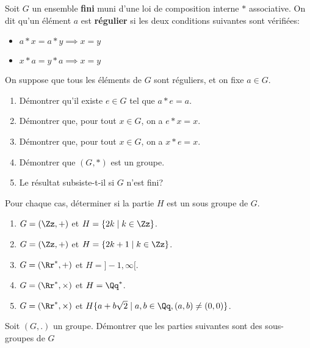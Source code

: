 \documentclass[10pt, a4paper, twocolumn]{homework}
\begin{document}
Soit $G$ un ensemble \textbf{fini} muni d'une loi de composition interne $*$
associative. On dit qu'un élément $a$ est \textbf{régulier} si les deux
conditions suivantes sont vérifiées:
\begin{itemize}
  \item $a * x = a * y \implies x = y$
  \item $x *a  = y * a \implies x = y$
\end{itemize}
On suppose que tous les éléments de $G$ sont réguliers, et on fixe $a\in G$.

\begin{enumerate}
  \item Démontrer qu'il existe $e\in G$ tel que $a*e = a$.\\[2pt]
  \item Démontrer que, pour tout $x\in G$, on a $e*x = x$.\\[2pt]
  \item Démontrer que, pour tout $x\in G$, on a $x*e = x$.\\[2pt]
  \item Démontrer que $\left(G, *\right)$ est un groupe.
  \item Le résultat subsiste-t-il si $G$ n'est fini?
\end{enumerate}



Pour chaque cas,  déterminer si la partie $H$ est un sous groupe de $G$.

\begin{enumerate}
  \item $G = \left(\Zz,+\right)$ et $H =\{2k\;|\; k\in \Zz\}$.
  \item $G = \left(\Zz,+\right)$ et $H =\{2k+1\;|\; k\in \Zz\}$.
  \item $G = \left(\Rr^{*},+\right)$ et $H =]-1,\infty[$.
  \item $G = \left(\Rr^{*},\times\right)$ et $H =\Qq^*$.
  \item $G = \left(\Rr^{*},\times\right)$ et $H \{a + b\sqrt{2}\;|\; a, b\in
    \Qq, (a,b)\neq (0,0)\}$.
\end{enumerate}
Soit $\left(G,.\right)$ un groupe. Démontrer que les parties suivantes sont des
sous-groupes de $G$
\end{document}
